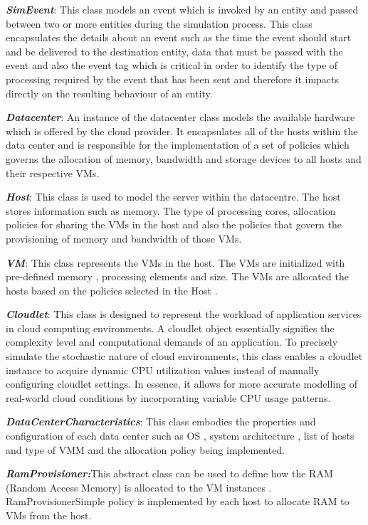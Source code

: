 \documentclass[a4paper,12pt]{Classes/RoboticsLaTeX}
\begin{document}
       \textbf{\textit{SimEvent}}: This class models an event which is invoked by an entity and passed between two or more entities during the simulation process. This class encapsulates the details about an event such as the time the event should start and be delivered to the destination entity, data that must be passed with the event and also the event tag which is critical in order to identify the type of processing required by the event that has been sent and therefore it impacts directly on the resulting behaviour of an entity.

       \textbf{\textit{Datacenter}}: An instance of the datacenter class models the available hardware which is offered by the cloud provider. It encapsulates all of the hosts within the data center and is responsible for the implementation of a set of policies which governs the allocation of memory, bandwidth and storage devices to all hosts and their respective VMs.

       \textbf{\textit{Host}}: This class is used to model the server within the datacentre. The host stores information such as memory. The type of processing cores, allocation policies for sharing the VMs in the host and also the policies that govern the provisioning of memory and bandwidth of those VMs.

       \textbf{\textit{VM}}: This class represents the VMs in the host. The VMs are initialized with pre-defined memory , processing elements and size. The VMs are allocated the hosts based on the policies selected in the Host .

       \textit{\textbf{Cloudlet}}: This class is designed to represent the workload of application services in cloud computing environments. A cloudlet object essentially signifies the complexity level and computational demands of an application. To precisely simulate the stochastic nature of cloud environments, this class enables a cloudlet instance to acquire dynamic CPU utilization values instead of manually configuring cloudlet settings. In essence, it allows for more accurate modelling of real-world cloud conditions by incorporating variable CPU usage patterns.

       \textbf{\textit{DataCenterCharacteristics}}: This class embodies the properties and configuration of each data center such as OS , system architecture , list of hosts and type of VMM and the allocation policy being implemented.    

       \textit{\textbf{RamProvisioner:}}This abstract class can be used to define how the RAM (Random Access Memory) is allocated to the VM instances . RamProvisionerSimple policy is implemented by each host to allocate RAM to VMs from the host.
\end{document}
